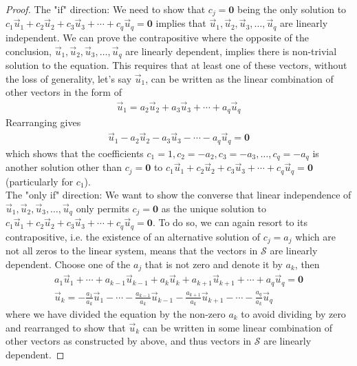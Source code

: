 \begin{proof}
The "if" direction: We need to show that $c_j = \textbf{0}$ being the only solution to $c_1\vec{u}_1 + c_2\vec{u}_2 + c_3\vec{u}_3 + \cdots + c_q\vec{u}_q = \textbf{0}$ implies that $\vec{u}_1, \vec{u}_2, \vec{u}_3, \ldots, \vec{u}_q$ are linearly independent. We can prove the contrapositive where the opposite of the conclusion, $\vec{u}_1, \vec{u}_2, \vec{u}_3, \ldots, \vec{u}_q$ are linearly dependent, implies there is non-trivial solution to the equation. This requires that at least one of these vectors, without the loss of generality, let's say $\vec{u}_1$, can be written as the linear combination of other vectors in the form of
\begin{align*}
\vec{u}_1 = a_2\vec{u}_2 + a_3\vec{u}_3 + \cdots + a_q\vec{u}_q
\end{align*}
Rearranging gives 
\begin{align*}
\vec{u}_1 - a_2\vec{u}_2 - a_3\vec{u}_3 - \cdots - a_q\vec{u}_q = \textbf{0}
\end{align*}
which shows that the coefficients $c_1 = 1, c_2 = -a_2, c_3 = -a_3, \ldots, c_q = -a_q$ is another solution other than $c_j = \textbf{0}$ to $c_1\vec{u}_1 + c_2\vec{u}_2 + c_3\vec{u}_3 + \cdots + c_q\vec{u}_q = \textbf{0}$ (particularly for $c_1$). \\
The "only if" direction: We want to show the converse that linear independence of $\vec{u}_1, \vec{u}_2, \vec{u}_3, \ldots, \vec{u}_q$ only permits $c_j = \textbf{0}$ as the unique solution to $c_1\vec{u}_1 + c_2\vec{u}_2 + c_3\vec{u}_3 + \cdots + c_q\vec{u}_q = \textbf{0}$. To do so, we can again resort to its contrapositive, i.e. the existence of an alternative solution of $c_j = a_j$ which are not all zeros to the linear system, means that the vectors in $\mathcal{S}$ are linearly dependent. Choose one of the $a_j$ that is not zero and denote it by $a_k$, then
\begin{align*}
a_1\vec{u}_1 + \cdots + a_{k-1}\vec{u}_{k-1} + a_k\vec{u}_k + a_{k+1}\vec{u}_{k+1} + \cdots + a_q\vec{u}_q = \textbf{0} \\
\vec{u}_k = -\frac{a_1}{a_k}\vec{u}_1 - \cdots - \frac{a_{k-1}}{a_k}\vec{u}_{k-1} - \frac{a_{k+1}}{a_k}\vec{u}_{k+1} - \cdots - \frac{a_q}{a_k}\vec{u}_q 
\end{align*}
where we have divided the equation by the non-zero $a_k$ to avoid dividing by zero and rearranged to show that $\vec{u}_k$ can be written in some linear combination of other vectors as constructed by above, and thus vectors in $\mathcal{S}$ are linearly dependent. 
\end{proof}
